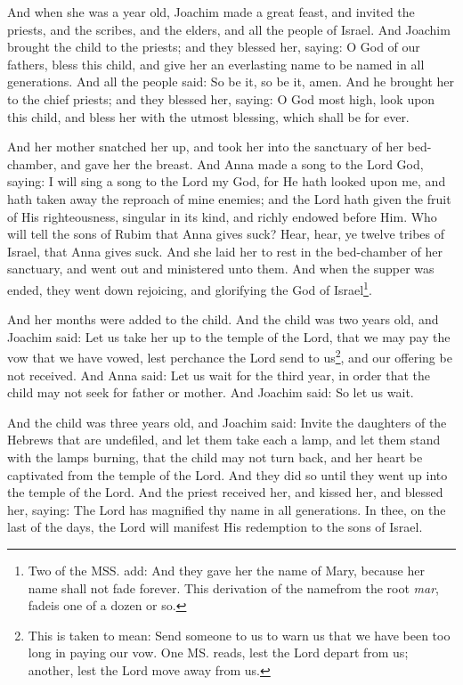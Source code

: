 \pend\pstart
And when she was a year old, Joachim made a great feast, and invited the priests, and the scribes, and the elders, and all the people of Israel. And Joachim brought the child to the priests; and they blessed her, saying: O God of our fathers, bless this child, and give her an everlasting name to be named in all generations. And all the people said: So be it, so be it, amen. And he brought her to the chief priests; and they blessed her, saying: O God most high, look upon this child, and bless her with the utmost blessing, which shall be for ever.

\pend\pstart
And her mother snatched her up, and took her into the sanctuary of her bed-chamber, and gave her the breast. And Anna made a song to the Lord God, saying: I will sing a song to the Lord my God, for He hath looked upon me, and hath taken away the reproach of mine enemies; and the Lord hath given the fruit of His righteousness, singular in its kind, and richly endowed before Him. Who will tell the sons of Rubim that Anna gives suck? Hear, hear, ye twelve tribes of Israel, that Anna gives suck. And she laid her to rest in the bed-chamber of her sanctuary, and went out and ministered unto them. And when the supper was ended, they went down rejoicing, and glorifying the God of Israel\footnote{Two of the MSS. add: And they gave her the name of Mary, because her name shall not fade forever. This derivation of the name\textemdash from the root \textit{mar}, fade\textemdash is one of a dozen or so.}.

\pend\pstart
{}

\pend\pstart
And her months were added to the child. And the child was two years old, and Joachim said: Let us take her up to the temple of the Lord, that we may pay the vow that we have vowed, lest perchance the Lord send to us\footnote{This is taken to mean: Send someone to us to warn us that we have been too long in paying our vow. One MS. reads, lest the Lord depart from us; another, lest the Lord move away from us.}, and our offering be not received. And Anna said: Let us wait for the third year, in order that the child may not seek for father or mother. And Joachim said: So let us wait.

\pend\pstart
And the child was three years old, and Joachim said: Invite the daughters of the Hebrews that are undefiled, and let them take each a lamp, and let them stand with the lamps burning, that the child may not turn back, and her heart be captivated from the temple of the Lord. And they did so until they went up into the temple of the Lord. And the priest received her, and kissed her, and blessed her, saying: The Lord has magnified thy name in all generations. In thee, on the last of the days, the Lord will manifest His redemption to the sons of Israel.


